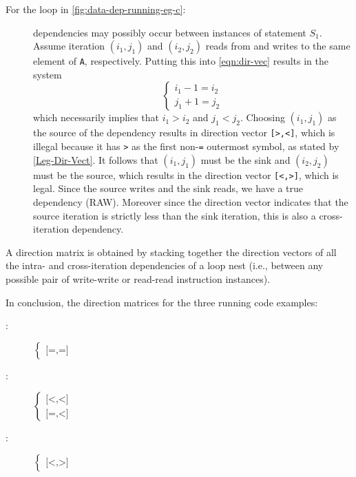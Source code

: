 \begin{description}
\item[For the loop in \cref{fig:data-dep-running-eg-c}:] dependencies
  may possibly occur between instances of statement $S_1$.  Assume
  iteration $(i_1,j_1)$ and $(i_2,j_2)$ reads from and writes to the
  same element of \texttt{A}, respectively.  Putting this into
  \cref{eqn:dir-vec} results in the system
  \[
    \begin{cases}i_1-1 = i_2\\j_1+1 = j_2\end{cases}
  \]
  which necessarily implies that $i_1 > i_2$ and $j_1 < j_2$. Choosing
  $(i_1,j_1)$ as the source of the dependency results in direction
  vector \texttt{[>,<]}, which is illegal because it has \texttt{>} as
  the first non-\texttt{=} outermost symbol, as stated by
  \cref{Leg-Dir-Vect}. It follows that $(i_1,j_1)$ must be the sink
  and $(i_2,j_2)$ must be the source, which results in the direction
  vector \texttt{[<,>]}, which is legal. Since the source writes and
  the sink reads, we have a true dependency (RAW).  Moreover since the
  direction vector indicates that the source iteration is strictly
  less than the sink iteration, this is also a cross-iteration
  dependency.
\end{description}

\begin{definition}\label{Dep-Dir-Mat}
  A direction matrix is obtained by stacking together the
  direction vectors of all the intra- and cross-iteration
  dependencies of a loop nest (i.e., between any possible
  pair of write-write or read-read instruction instances).
\end{definition}

In conclusion, the direction matrices for the three running code
examples:

\begin{description}
\item[:]
  $\begin{cases}\texttt{[=,=]}\end{cases}$
\item[:]
  $\begin{cases}\texttt{[<,<]}\\\texttt{[=,<]}\end{cases}$
\item[:]
  $\begin{cases}\texttt{[<,>]}\end{cases}$
\end{description}

